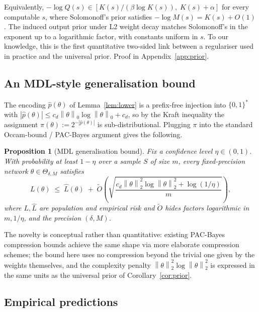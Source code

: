 \documentclass{article}
\newtheorem{proposition}[theorem]{Proposition}
\theoremstyle{definition}
\newcommand{\B}{\{0,1\}}
\newcommand{\norm}[1]{\left\lVert#1\right\rVert}
\newcommand{\Param}{\Theta}
\begin{document}
Equivalently, $-\log Q(s) \in [K(s)/(\beta \log K(s)),\; K(s) + \alpha]$ for
every computable $s$, where Solomonoff's prior satisfies $-\log M(s) = K(s) +
  O(1)$ \citep{li2008introduction}. The induced output prior under L2 weight
decay matches Solomonoff's in the exponent up to a logarithmic factor, with
constants uniform in $s$. To our knowledge, this is the first quantitative
two-sided link between a regulariser used in practice and the universal prior.
Proof in Appendix~\ref{app:prior}.

\subsection{An MDL-style generalisation bound}

The encoding $\hat p(\theta)$ of Lemma~\ref{lem:lower} is a prefix-free
injection into $\B^*$ with $|\hat p(\theta)| \le c_d \norm{\theta}_0 \log
  \norm{\theta}_0 + c_d$, so by the Kraft inequality the assignment $\pi(\theta)
  := 2^{-|\hat p(\theta)|}$ is sub-distributional. Plugging $\pi$ into the
standard Occam-bound / PAC-Bayes argument
\citep{arora2018stronger,lotter2022pacbayes} gives the following.

\begin{proposition}[MDL generalisation bound]\label{prop:gen}
  Fix a confidence level $\eta \in (0, 1)$. With probability at least $1 - \eta$
  over a sample $S$ of size $m$, every fixed-precision network $\theta \in
    \Param_{\delta, M}$ satisfies
  \[
    L(\theta) \;\le\; \hat L(\theta) \;+\; \widetilde O\!\left(\sqrt{\frac{c_d \norm{\theta}_2^2 \log \norm{\theta}_2^2 + \log(1/\eta)}{m}}\right),
  \]
  where $L, \hat L$ are population and empirical risk and $\widetilde O$ hides
  factors logarithmic in $m, 1/\eta$, and the precision $(\delta, M)$.
\end{proposition}

The novelty is conceptual rather than quantitative: existing PAC-Bayes
compression bounds \citep{arora2018stronger,lotter2022pacbayes} achieve the
same shape via more elaborate compression schemes; the bound here uses no
compression beyond the trivial one given by the weights themselves, and the
complexity penalty $\norm{\theta}_2^2 \log \norm{\theta}_2^2$ is expressed in
the same units as the universal prior of Corollary~\ref{cor:prior}.

\subsection{Empirical predictions}\label{sec:implications:predictions}
\end{document}
